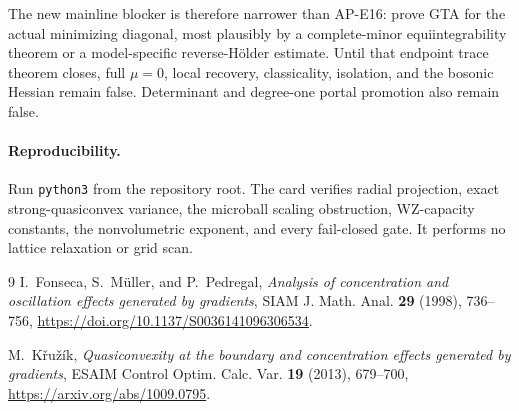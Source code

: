 \documentclass[10pt]{article}
\begin{document}
The new mainline blocker is therefore narrower than AP-E16: prove GTA for
the actual minimizing diagonal, most plausibly by a complete-minor
equiintegrability theorem or a model-specific reverse-H\"older estimate.
Until that endpoint trace theorem closes, full $\mu=0$, local recovery,
classicality, isolation, and the bosonic Hessian remain false.  Determinant
and degree-one portal promotion also remain false.

\paragraph{Reproducibility.}
Run \texttt{python3}
from the repository root.  The card verifies radial projection, exact
strong-quasiconvex variance, the microball scaling obstruction, WZ-capacity
constants, the nonvolumetric exponent, and every fail-closed gate.  It
performs no lattice relaxation or grid scan.

\begin{thebibliography}{9}
I.~Fonseca, S.~M\"uller, and P.~Pedregal,
\emph{Analysis of concentration and oscillation effects generated by
gradients}, SIAM J. Math. Anal. \textbf{29} (1998), 736--756,
\url{https://doi.org/10.1137/S0036141096306534}.

M.~K\v{r}u\v{z}\'ik,
\emph{Quasiconvexity at the boundary and concentration effects generated by
gradients}, ESAIM Control Optim. Calc. Var. \textbf{19} (2013), 679--700,
\url{https://arxiv.org/abs/1009.0795}.
\end{thebibliography}
\end{document}
